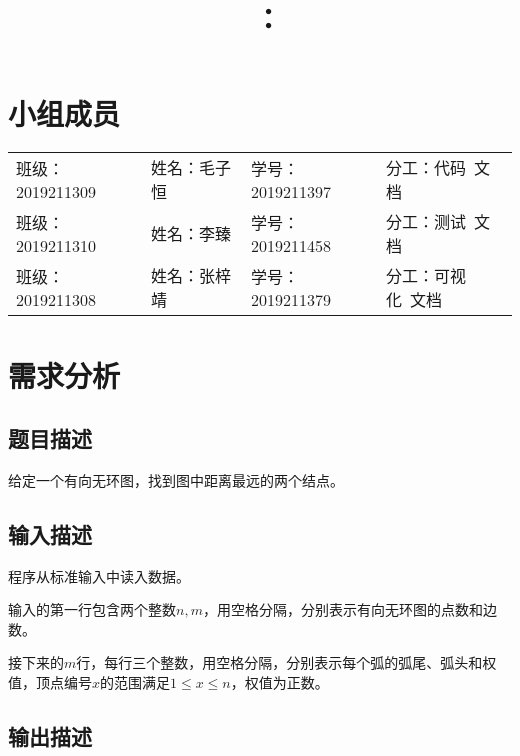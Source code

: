 \documentclass{article}
\title{\hmwkClass\ ：\hmwkTitle}
\author{\hmwkAuthorName}
\begin{document}
\maketitle

\section*{小组成员}

\setlength{\tabcolsep}{9mm}
{
    \begin{table}[htbp]
        \centering
        \begin{tabular}{llll}
            班级：2019211309 & 姓名：毛子恒 & 学号：2019211397 & 分工：代码\ 文档   \\

            班级：2019211310 & 姓名：李臻   & 学号：2019211458 & 分工：测试\ 文档   \\

            班级：2019211308 & 姓名：张梓靖 & 学号：2019211379 & 分工：可视化\ 文档 \\
        \end{tabular}
    \end{table}
}

\tableofcontents
\newpage

\section{需求分析}

\subsection{题目描述}

给定一个有向无环图，找到图中距离最远的两个结点。

\subsection{输入描述}

程序从标准输入中读入数据。

输入的第一行包含两个整数$n,m$，用空格分隔，分别表示有向无环图的点数和边数。

接下来的$m$行，每行三个整数，用空格分隔，分别表示每个弧的弧尾、弧头和权值，顶点编号$x$的范围满足$1\leq x\leq n$，权值为正数。

\subsection{输出描述}
\end{document}
